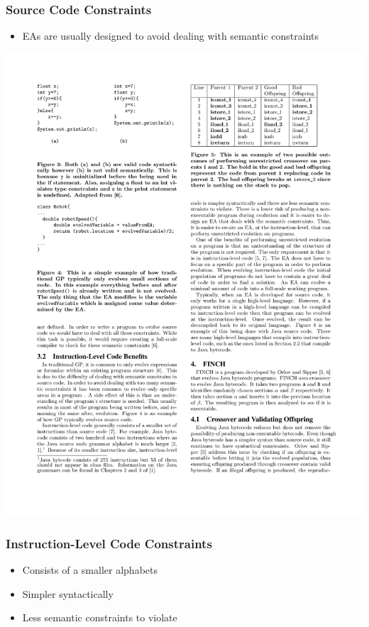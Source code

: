 \documentclass{beamer}
\begin{document}
\begin{frame}
	\frametitle{Source Code Constraints}
	\begin{itemize}
		\item EAs are usually designed to avoid dealing with semantic constraints
	\end{itemize}		
\includegraphics[height=.5\textheight]{Illustrations/traditialGP.pdf}
\end{frame}


\begin{frame}
	\frametitle{Instruction-Level Code Constraints}
	\begin{itemize}
		\item Consists of a smaller alphabets
		\item Simpler syntactically
		\item Less semantic constraints to violate
	\end{itemize}		

\end{frame}
\end{document}
